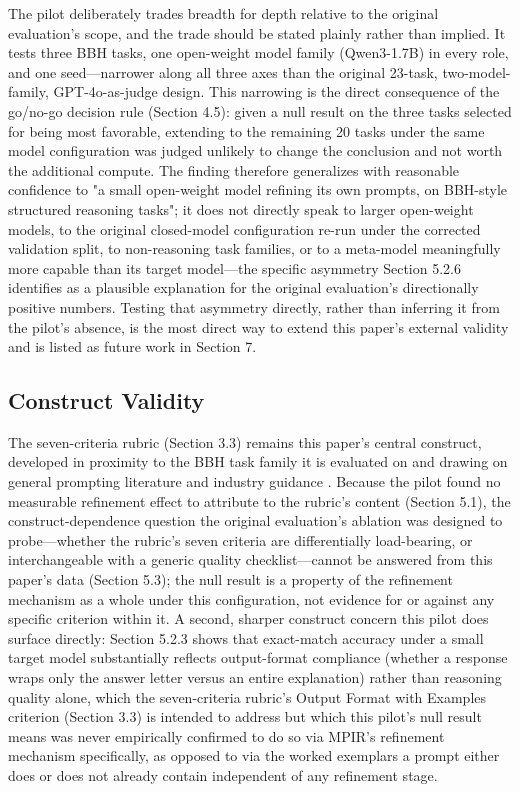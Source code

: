 \documentclass[a4paper,fleqn]{cas-sc}
\begin{document}
The pilot deliberately trades breadth for depth relative to the original evaluation's scope, and the trade should be stated plainly rather than implied. It tests three BBH tasks, one open-weight model family (Qwen3-1.7B) in every role, and one seed---narrower along all three axes than the original 23-task, two-model-family, GPT-4o-as-judge design. This narrowing is the direct consequence of the go/no-go decision rule (Section 4.5): given a null result on the three tasks selected for being most favorable, extending to the remaining 20 tasks under the same model configuration was judged unlikely to change the conclusion and not worth the additional compute. The finding therefore generalizes with reasonable confidence to "a small open-weight model refining its own prompts, on BBH-style structured reasoning tasks"; it does not directly speak to larger open-weight models, to the original closed-model configuration re-run under the corrected validation split, to non-reasoning task families, or to a meta-model meaningfully more capable than its target model---the specific asymmetry Section 5.2.6 identifies as a plausible explanation for the original evaluation's directionally positive numbers. Testing that asymmetry directly, rather than inferring it from the pilot's absence, is the most direct way to extend this paper's external validity and is listed as future work in Section 7.

\subsection{Construct Validity}

The seven-criteria rubric (Section 3.3) remains this paper's central construct, developed in proximity to the BBH task family it is evaluated on and drawing on general prompting literature \citep{schulhoff2024,sahoo2024,li2025} and industry guidance \citep{boonstra2025,anthropic2025,openai2025,microsoft2025}. Because the pilot found no measurable refinement effect to attribute to the rubric's content (Section 5.1), the construct-dependence question the original evaluation's ablation was designed to probe---whether the rubric's seven criteria are differentially load-bearing, or interchangeable with a generic quality checklist---cannot be answered from this paper's data (Section 5.3); the null result is a property of the refinement mechanism as a whole under this configuration, not evidence for or against any specific criterion within it. A second, sharper construct concern this pilot does surface directly: Section 5.2.3 shows that exact-match accuracy under a small target model substantially reflects output-format compliance (whether a response wraps only the answer letter versus an entire explanation) rather than reasoning quality alone, which the seven-criteria rubric's Output Format with Examples criterion (Section 3.3) is intended to address but which this pilot's null result means was never empirically confirmed to do so via MPIR's refinement mechanism specifically, as opposed to via the worked exemplars a prompt either does or does not already contain independent of any refinement stage.
\end{document}
